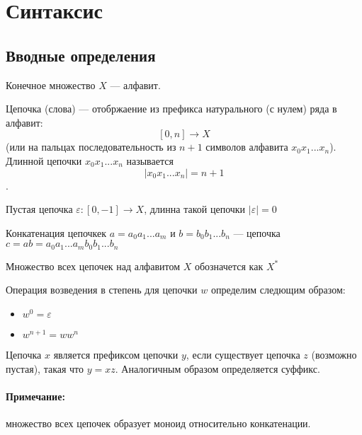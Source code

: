 \section{Синтаксис}

\subsection{Вводные определения}

\begin{Def}
Конечное множество $X$ --- алфавит.
\end{Def}

\begin{Def}
Цепочка (слова) --- отобржаение из префикса натурального (с нулем) ряда в алфавит: $$\left[0,n\right] \rightarrow X$$ (или на пальцах последовательность из $n+1$
символов алфавита $x_0x_1...x_n$). Длинной цепочки $x_0x_1...x_n$ называется $$\left|x_0x_1...x_n\right| = n+1$$.

Пустая цепочка $\varepsilon : \left[0, -1\right] \rightarrow X$, длинна такой цепочки $\left|\varepsilon\right| = 0$
\end{Def}

\begin{Def}
Конкатенация цепочкек $a = a_0a_1...a_{m}$ и $b = b_0b_1...b_{n}$ --- цепочка $c = ab = a_0a_1...a_{m}b_0b_1...b_{n}$
\end{Def}

\begin{Def}
Множество всех цепочек над алфавитом $X$ обозначется как $X^*$
\end{Def}

\begin{Def}
Операция возведения в степень для цепочки $w$ определим следющим образом:
\begin{itemize}
\item $w^0 = \varepsilon$

\item $w^{n+1} = ww^{n}$
\end{itemize}
\end{Def}

\begin{Def}
Цепочка $x$ является префиксом цепочки $y$, если существует цепочка $z$ (возможно пустая), такая что $y = xz$. Аналогичным образом определяется суффикс.
\end{Def}

\paragraph{Примечание:} множество всех цепочек образует моноид относительно конкатенации.

